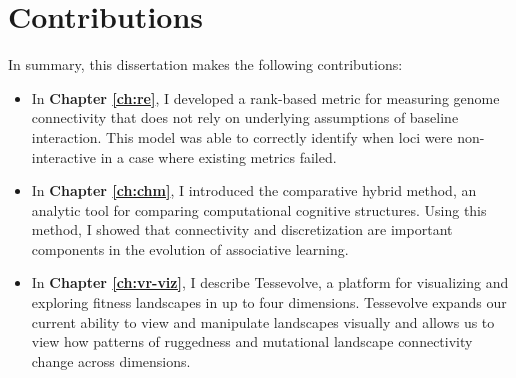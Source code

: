\section{Contributions}

In summary, this dissertation makes the following contributions:

\begin{itemize}
    \item In \textbf{Chapter \ref{ch:re}}, I developed a rank-based metric for measuring genome connectivity that does not rely on underlying assumptions of baseline interaction. This model was able to correctly identify when loci were non-interactive in a case where existing metrics failed.
    \item In \textbf{Chapter \ref{ch:chm}}, I introduced the comparative hybrid method, an analytic tool for comparing computational cognitive structures. Using this method, I showed that connectivity and discretization are important components in the evolution of associative learning.
    \item In \textbf{Chapter \ref{ch:vr-viz}}, I describe Tessevolve, a platform for visualizing and exploring fitness landscapes in up to four dimensions. Tessevolve expands our current ability to view and manipulate landscapes visually and allows us to view how patterns of ruggedness and mutational landscape connectivity change across dimensions.
\end{itemize}